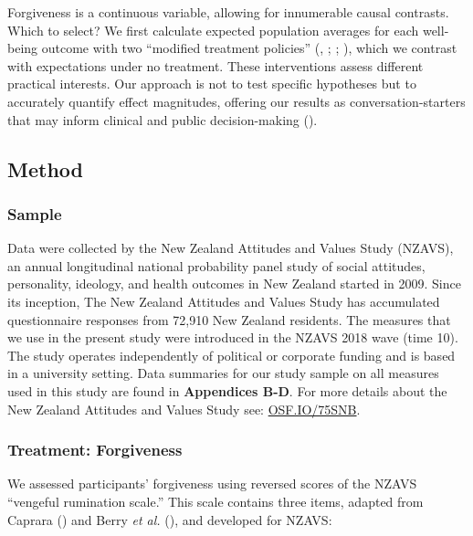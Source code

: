 \documentclass[
  single column]{article}
\begin{document}
Forgiveness is a continuous variable, allowing for innumerable causal
contrasts. Which to select? We first calculate expected population
averages for each well-being outcome with two ``modified treatment
policies'' (,
;
;
), which we
contrast with expectations under no treatment. These interventions
assess different practical interests. Our approach is not to test
specific hypotheses but to accurately quantify effect magnitudes,
offering our results as conversation-starters that may inform clinical
and public decision-making ().

\subsection{Method}\label{method}

\subsubsection{Sample}\label{sample}

Data were collected by the New Zealand Attitudes and Values Study
(NZAVS), an annual longitudinal national probability panel study of
social attitudes, personality, ideology, and health outcomes in New
Zealand started in 2009. Since its inception, The New Zealand Attitudes
and Values Study has accumulated questionnaire responses from 72,910 New
Zealand residents. The measures that we use in the present study were
introduced in the NZAVS 2018 wave (time 10). The study operates
independently of political or corporate funding and is based in a
university setting. Data summaries for our study sample on all measures
used in this study are found in \textbf{Appendices B-D}. For more
details about the New Zealand Attitudes and Values Study see:
\href{https://doi.org/10.17605/OSF.IO/75SNB}{OSF.IO/75SNB}.

\subsubsection{Treatment: Forgiveness}\label{treatment-forgiveness}

We assessed participants' forgiveness using reversed scores of the NZAVS
``vengeful rumination scale.'' This scale contains three items, adapted
from Caprara () and Berry
\emph{et al.} (), and
developed for NZAVS:
\end{document}
